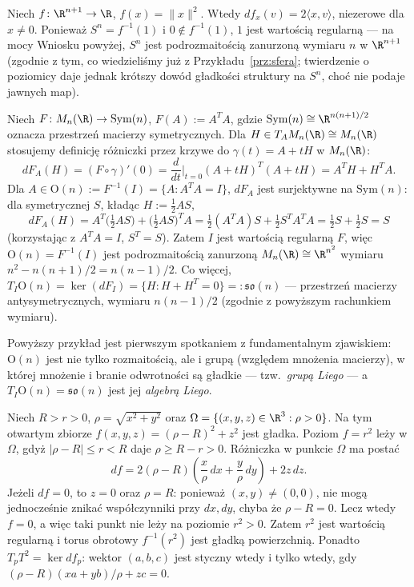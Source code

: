 \begin{przyklad}
Niech $f\colon\R^{n+1}\to\R$, $f(x)=\|x\|^2$. Wtedy $df_x(v)=2\langle x,v\rangle$, niezerowe
dla $x\neq0$. Ponieważ $S^n=f^{-1}(1)$ i $0\notin f^{-1}(1)$, $1$ jest wartością regularną
— na mocy Wniosku powyżej, $S^n$ jest podrozmaitością zanurzoną wymiaru $n$ w $\R^{n+1}$
(zgodnie z tym, co wiedzieliśmy już z Przykładu~\ref{prz:sfera}; twierdzenie o poziomicy
daje jednak krótszy dowód gładkości struktury na $S^n$, choć nie podaje jawnych map).
\end{przyklad}

\begin{przyklad}
Niech $F\colon M_n(\R)\to\mathrm{Sym}(n)$, $F(A):=A^TA$, gdzie $\mathrm{Sym}(n)\cong
\R^{n(n+1)/2}$ oznacza przestrzeń macierzy symetrycznych. Dla $H\in T_AM_n(\R)\cong M_n(\R)$
stosujemy definicję różniczki przez krzywe do $\gamma(t)=A+tH$ w $M_n(\R)$:
\[
dF_A(H)=(F\circ\gamma)'(0)=\frac{d}{dt}\Big|_{t=0}(A+tH)^T(A+tH)=A^TH+H^TA.
\]
Dla $A\in\mathrm{O}(n):=F^{-1}(I)=\{A:A^TA=I\}$, $dF_A$ jest surjektywne na
$\mathrm{Sym}(n)$: dla symetrycznej $S$, kładąc $H:=\tfrac12AS$,
\[
dF_A(H)=A^T\big(\tfrac12AS\big)+\big(\tfrac12AS\big)^TA=\tfrac12(A^TA)S+\tfrac12S^TA^TA=
\tfrac12S+\tfrac12S=S
\]
(korzystając z $A^TA=I$, $S^T=S$). Zatem $I$ jest wartością regularną $F$, więc
$\mathrm{O}(n)=F^{-1}(I)$ jest podrozmaitością zanurzoną $M_n(\R)\cong\R^{n^2}$ wymiaru
$n^2-n(n+1)/2=n(n-1)/2$. Co więcej, $T_I\mathrm{O}(n)=\ker(dF_I)=\{H:H+H^T=0\}=:
\mathfrak{so}(n)$ — przestrzeń macierzy antysymetrycznych, wymiaru $n(n-1)/2$ (zgodnie z
powyższym rachunkiem wymiaru).
\end{przyklad}

\begin{uwaga}
Powyższy przykład jest pierwszym spotkaniem z fundamentalnym zjawiskiem: $\mathrm{O}(n)$
jest nie tylko rozmaitością, ale i grupą (względem mnożenia macierzy), w której mnożenie i
branie odwrotności są gładkie — tzw.\ \emph{grupą Liego} — a $T_I\mathrm{O}(n)=
\mathfrak{so}(n)$ jest jej \emph{algebrą Liego}.
\end{uwaga}

\begin{przyklad}
Niech $R>r>0$, $\rho=\sqrt{x^2+y^2}$ oraz
$\Omega=\{(x,y,z)\in\R^3:\rho>0\}$. Na tym otwartym zbiorze
$f(x,y,z)=(\rho-R)^2+z^2$ jest gładka. Poziom $f=r^2$
leży w $\Omega$, gdyż $|\rho-R|\leq r<R$ daje $\rho\geq R-r>0$.
Różniczka w punkcie $\Omega$ ma postać
\[
df=2(\rho-R)\left(\frac{x}{\rho}\,dx+
\frac{y}{\rho}\,dy\right)+2z\,dz.
\]
Jeżeli $df=0$, to $z=0$ oraz $\rho=R$: ponieważ $(x,y)\ne(0,0)$,
nie mogą jednocześnie znikać współczynniki przy $dx,dy$, chyba że
$\rho-R=0$. Lecz wtedy $f=0$, a więc taki punkt nie leży na
poziomie $r^2>0$. Zatem $r^2$ jest wartością regularną i torus
obrotowy $f^{-1}(r^2)$ jest gładką powierzchnią. Ponadto
$T_pT^2=\ker df_p$: wektor $(a,b,c)$ jest styczny wtedy i tylko
wtedy, gdy $(\rho-R)(xa+yb)/\rho+zc=0$.
\end{przyklad}

